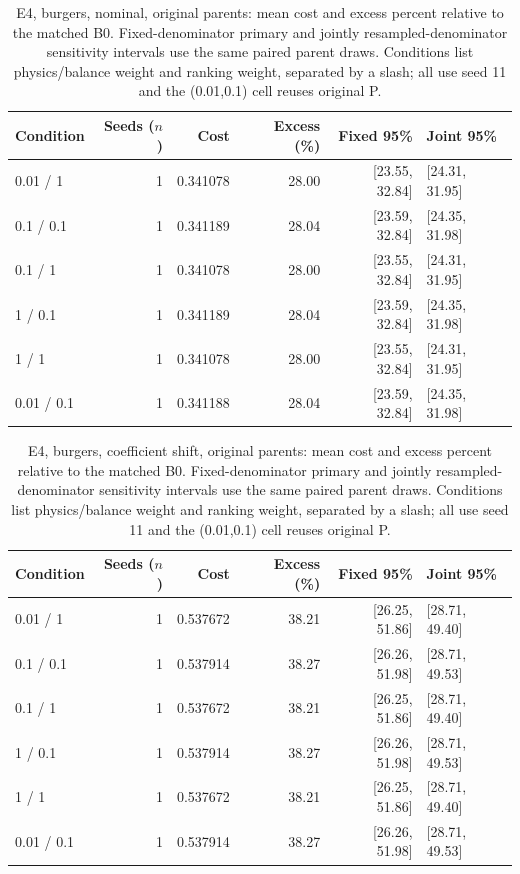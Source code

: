 \begin{table}[ht]
\centering\small
\caption{E4, burgers, nominal, original parents: mean cost and excess percent relative to the matched B0. Fixed-denominator primary and jointly resampled-denominator sensitivity intervals use the same paired parent draws. Conditions list physics/balance weight and ranking weight, separated by a slash; all use seed 11 and the (0.01,0.1) cell reuses original P.}\label{tab:revision_cost_E4_burgers_locked_nominal}
\begin{tabular}{@{}lrrrrl@{}}\toprule
Condition & Seeds ($n$) & Cost & Excess (\%) & Fixed 95\% & Joint 95\%\\\midrule
0.01 / 1 & 1 & 0.341078 & 28.00 & [23.55, 32.84] & [24.31, 31.95]\\
0.1 / 0.1 & 1 & 0.341189 & 28.04 & [23.59, 32.84] & [24.35, 31.98]\\
0.1 / 1 & 1 & 0.341078 & 28.00 & [23.55, 32.84] & [24.31, 31.95]\\
1 / 0.1 & 1 & 0.341189 & 28.04 & [23.59, 32.84] & [24.35, 31.98]\\
1 / 1 & 1 & 0.341078 & 28.00 & [23.55, 32.84] & [24.31, 31.95]\\
0.01 / 0.1 & 1 & 0.341188 & 28.04 & [23.59, 32.84] & [24.35, 31.98]\\
\bottomrule\end{tabular}
\end{table}

\begin{table}[ht]
\centering\small
\caption{E4, burgers, coefficient shift, original parents: mean cost and excess percent relative to the matched B0. Fixed-denominator primary and jointly resampled-denominator sensitivity intervals use the same paired parent draws. Conditions list physics/balance weight and ranking weight, separated by a slash; all use seed 11 and the (0.01,0.1) cell reuses original P.}\label{tab:revision_cost_E4_burgers_locked_coefficient_ood}
\begin{tabular}{@{}lrrrrl@{}}\toprule
Condition & Seeds ($n$) & Cost & Excess (\%) & Fixed 95\% & Joint 95\%\\\midrule
0.01 / 1 & 1 & 0.537672 & 38.21 & [26.25, 51.86] & [28.71, 49.40]\\
0.1 / 0.1 & 1 & 0.537914 & 38.27 & [26.26, 51.98] & [28.71, 49.53]\\
0.1 / 1 & 1 & 0.537672 & 38.21 & [26.25, 51.86] & [28.71, 49.40]\\
1 / 0.1 & 1 & 0.537914 & 38.27 & [26.26, 51.98] & [28.71, 49.53]\\
1 / 1 & 1 & 0.537672 & 38.21 & [26.25, 51.86] & [28.71, 49.40]\\
0.01 / 0.1 & 1 & 0.537914 & 38.27 & [26.26, 51.98] & [28.71, 49.53]\\
\bottomrule\end{tabular}
\end{table}

